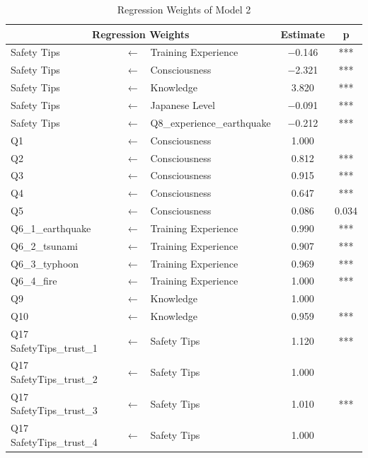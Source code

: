 \begin{table}[h]
  \caption{Regression Weights of Model 2}
  \label{table11}
  \centering
  \begin{tabular}{|l|c|l|c|c|}
 \hline
 \multicolumn{3}{|c|}{Regression Weights} & Estimate & p \\
 \hline
  Safety Tips & $\longleftarrow$ & Training Experience & $-$0.146 & *** \\
  Safety Tips & $\longleftarrow$ & Consciousness & $-$2.321 & *** \\
  Safety Tips & $\longleftarrow$ & Knowledge & 3.820 & *** \\
  Safety Tips & $\longleftarrow$ & Japanese Level & $-$0.091 & *** \\
  Safety Tips & $\longleftarrow$ & Q8\_experience\_earthquake & $-$0.212 & *** \\
  Q1              & $\longleftarrow$ & Consciousness & 1.000 &  \\
  Q2              & $\longleftarrow$ & Consciousness & 0.812 & *** \\
  Q3              & $\longleftarrow$ & Consciousness & 0.915 & *** \\
  Q4              & $\longleftarrow$ & Consciousness & 0.647 & *** \\
  Q5              & $\longleftarrow$ & Consciousness & 0.086 & 0.034 \\
  Q6\_1\_earthquake & $\longleftarrow$ & Training Experience & 0.990 & *** \\
  Q6\_2\_tsunami & $\longleftarrow$ & Training Experience & 0.907 & *** \\
  Q6\_3\_typhoon & $\longleftarrow$ & Training Experience & 0.969 & *** \\
  Q6\_4\_fire & $\longleftarrow$ & Training Experience & 1.000 & *** \\
  Q9             & $\longleftarrow$ & Knowledge & 1.000 & \\
  Q10           & $\longleftarrow$ & Knowledge & 0.959 & *** \\
  Q17 SafetyTips\_trust\_1 & $\longleftarrow$ & Safety Tips & 1.120 & *** \\
  Q17 SafetyTips\_trust\_2 & $\longleftarrow$ & Safety Tips & 1.000 & \\
  Q17 SafetyTips\_trust\_3 & $\longleftarrow$ & Safety Tips & 1.010 & *** \\
  Q17 SafetyTips\_trust\_4 & $\longleftarrow$ & Safety Tips & 1.000 & \\
 \hline
  \end{tabular}
\end{table}

